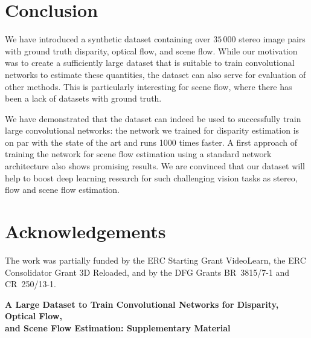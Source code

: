 \documentclass[10pt,twocolumn,letterpaper]{article}
\begin{document}
\section{Conclusion}\label{sec:conclusion}
We have introduced a  synthetic dataset containing over $35\,000$ stereo image pairs with ground truth disparity, optical flow, and scene flow. While our motivation was to create a sufficiently large dataset that is suitable to train convolutional networks to estimate these quantities, the dataset can also serve for evaluation of other methods. This is particularly interesting for scene flow, where there has been a lack of datasets with ground truth.

We have demonstrated that the dataset can indeed be used to successfully train large convolutional networks: the network we trained for disparity estimation is on par with the state of the art and runs 1000 times faster. 
A first approach of training the network for scene flow estimation using a standard network architecture also shows promising results.  We are convinced that our dataset will help to boost deep learning research for such challenging vision tasks as stereo, flow and scene flow estimation.



\section{Acknowledgements}\label{sec:acknowledgements}
The work was partially funded by the ERC Starting Grant VideoLearn, the ERC Consolidator Grant 3D Reloaded, and by the DFG Grants \mbox{BR 3815/7-1} and \mbox{CR 250/13-1}.


{\small


}


\begin{figure*}%
  \begin{center}%
    \textbf{\Large A Large Dataset to Train Convolutional Networks for Disparity, Optical Flow,\\\vspace{.25cm} and Scene Flow Estimation: Supplementary Material}
  \end{center}%
\end{figure*}%
\end{document}
